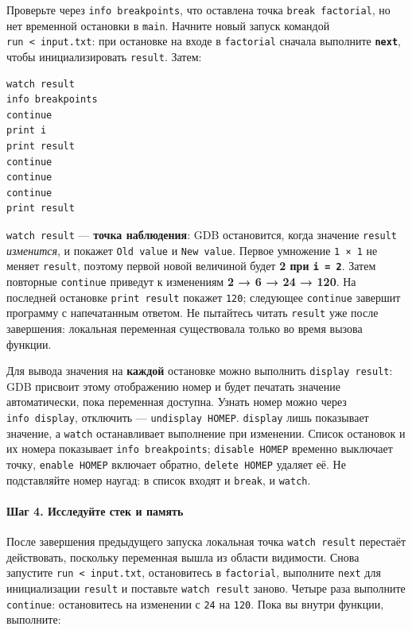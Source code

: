 Проверьте через \texttt{info\ breakpoints}, что оставлена точка
\texttt{break\ factorial}, но нет временной остановки в \texttt{main}.
Начните новый запуск командой \texttt{run\ \textless{}\ input.txt}: при
остановке на входе в \texttt{factorial} сначала выполните
\textbf{\texttt{next}}, чтобы инициализировать \texttt{result}. Затем:

\begin{verbatim}
watch result
info breakpoints
continue
print i
print result
continue
continue
continue
print result
\end{verbatim}

\texttt{watch\ result} --- \textbf{точка наблюдения}: GDB остановится,
когда значение \texttt{result} \emph{изменится}, и покажет
\texttt{Old\ value} и \texttt{New\ value}. Первое умножение
\texttt{1\ ×\ 1} не меняет \texttt{result}, поэтому первой новой
величиной будет \textbf{2 при \texttt{i\ =\ 2}}. Затем повторные
\texttt{continue} приведут к изменениям \textbf{2 → 6 → 24 → 120}. На
последней остановке \texttt{print\ result} покажет \texttt{120};
следующее \texttt{continue} завершит программу с напечатанным ответом.
Не пытайтесь читать \texttt{result} уже после завершения: локальная
переменная существовала только во время вызова функции.

Для вывода значения на \textbf{каждой} остановке можно выполнить
\texttt{display\ result}: GDB присвоит этому отображению номер и будет
печатать значение автоматически, пока переменная доступна. Узнать номер
можно через \texttt{info\ display}, отключить ---
\texttt{undisplay\ НОМЕР}. \texttt{display} лишь показывает значение, а
\texttt{watch} останавливает выполнение при изменении. Список остановок
и их номера показывает \texttt{info\ breakpoints};
\texttt{disable\ НОМЕР} временно выключает точку, \texttt{enable\ НОМЕР}
включает обратно, \texttt{delete\ НОМЕР} удаляет её. Не подставляйте
номер наугад: в список входят и \texttt{break}, и \texttt{watch}.

\hypertarget{ux448ux430ux433-4-ux438ux441ux441ux43bux435ux434ux443ux439ux442ux435-ux441ux442ux435ux43a-ux438-ux43fux430ux43cux44fux442ux44c}{%
\paragraph{Шаг 4. Исследуйте стек и
память}\label{ux448ux430ux433-4-ux438ux441ux441ux43bux435ux434ux443ux439ux442ux435-ux441ux442ux435ux43a-ux438-ux43fux430ux43cux44fux442ux44c}}

После завершения предыдущего запуска локальная точка
\texttt{watch\ result} перестаёт действовать, поскольку переменная вышла
из области видимости. Снова запустите
\texttt{run\ \textless{}\ input.txt}, остановитесь в \texttt{factorial},
выполните \texttt{next} для инициализации \texttt{result} и поставьте
\texttt{watch\ result} заново. Четыре раза выполните \texttt{continue}:
остановитесь на изменении с \texttt{24} на \texttt{120}. Пока вы внутри
функции, выполните:

